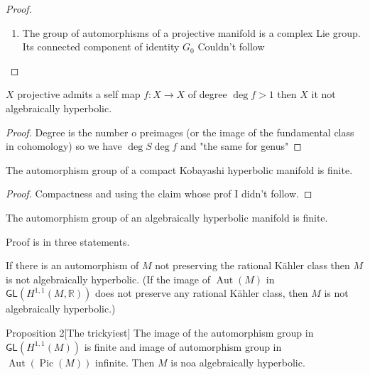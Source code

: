 \begin{proof}\leavevmode
\begin{enumerate}[label=\textbf{Step \arabic*}]
\item The group of automorphisms of a projective manifold is a complex Lie group. Its connected component of identity $G_0$ {\color{4}Couldn't follow}
\end{enumerate}
\end{proof}

\begin{thm}\leavevmode
$X$ projective admits a self map $f:X \to X$ of degree $\operatorname{deg}f>1$ then $X$ it not algebraically hyperbolic.
\end{thm}
\begin{proof}\leavevmode
Degree is the number o preimages (or the image of the fundamental class in cohomology) so we have $\operatorname{deg} S \operatorname{deg} f$ and "the same for genus"
\end{proof}

\begin{claim}\leavevmode
	The automorphism group of a compact Kobayashi hyperbolic manifold is finite.
\end{claim}

\begin{proof}\leavevmode
Compactness and using the claim whose prof I didn't follow.
\end{proof}

\begin{thm}\leavevmode
The automorphism group of an algebraically hyperbolic manifold is finite.
\end{thm}

Proof is in three statements.

\begin{prop}\leavevmode
	If there is an automorphism of $M$ not preserving the rational Kähler class then $M$ is not algebraically hyperbolic. (If the image of $\operatorname{Aut}(M)$ in $\mathsf{GL}(H^{1,1}(M,\mathbb{R}))$ does not preserve any rational Kähler class, then $M$ is not algebraically hyperbolic.)
\end{prop}

\begin{thing4}{Proposition 2}[The trickyiest]\leavevmode
	The image of the automorphism group in $\mathsf{GL}(H^{1,1}(M))$ is finite and image of automorphism group in $\operatorname{Aut}(\operatorname{Pic}(M))$ infinite. Then $M$ is noa algebraically hyperbolic.
\end{thing4}

